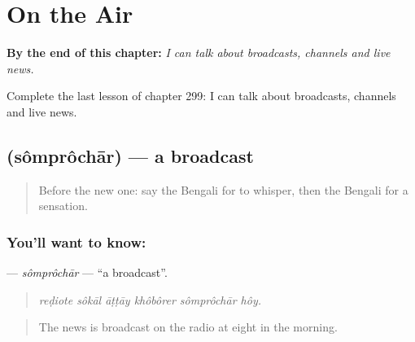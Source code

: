 
\chapter{On the Air}
\label{ch:bn-on-the-air}

\begin{chapteropening}
\textbf{By the end of this chapter:} \emph{I can talk about broadcasts, channels and live news.}

Complete the last lesson of chapter 299: I can talk about broadcasts, channels and live news.
\end{chapteropening}

\section[\texorpdfstring{\bn{সম্প্রচার} (sômprôchār)}{সম্প্রচার (sômprôchār)}]{ (sômprôchār) — a broadcast}

\label{lesson:BN-C299-somprochar}



\begin{quote}
Before the new one: say the Bengali for to whisper, then the Bengali for a sensation.
\end{quote}

\subsection*{You'll want to know: }
\textbf{} — \emph{sômprôchār} — \textquotedblleft{}a broadcast\textquotedblright{}.

\begin{quote}
     
\end{quote}

\begin{quote}
\emph{reḍiote sôkāl āṭṭāy khôbôrer sômprôchār hôy.}
\end{quote}

\begin{quote}
The news is broadcast on the radio at eight in the morning.
\end{quote}

